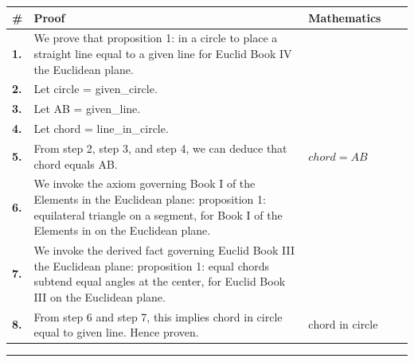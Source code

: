 \documentclass[11pt]{article}
\theoremstyle{definition}
\begin{document}
\begin{tabular}{@{} >{\raggedright\arraybackslash}p{} >{\raggedright\arraybackslash}p{} >{\raggedleft\arraybackslash}p{} @{}}
\textbf{\#} & \textbf{Proof} & \textbf{Mathematics} \\
\midrule
\textbf{1.} & We prove that proposition 1: in a circle to place a straight line equal to a given line for Euclid Book IV the Euclidean plane. & \\[0.45em]
\textbf{2.} & Let circle = given\_circle. & \\[0.45em]
\textbf{3.} & Let AB = given\_line. & \\[0.45em]
\textbf{4.} & Let chord = line\_in\_circle. & \\[0.45em]
\textbf{5.} & From step 2, step 3, and step 4, we can deduce that chord equals AB. & $\displaystyle chord = AB$ \\[0.45em]
\textbf{6.} & We invoke the axiom governing Book I of the Elements in the Euclidean plane: proposition 1: equilateral triangle on a segment, for Book I of the Elements in on the Euclidean plane. & \\[0.45em]
\textbf{7.} & We invoke the derived fact governing Euclid Book III the Euclidean plane: proposition 1: equal chords subtend equal angles at the center, for Euclid Book III on the Euclidean plane. & \\[0.45em]
\textbf{8.} & From step 6 and step 7, this implies chord in circle equal to given line. Hence proven. & $\displaystyle \text{chord in circle equal to given line}$ \\[0.45em]
\bottomrule
\end{tabular}
\label{thm:Geometry-Euclid Book IV-proposition_1_in_a_circle_to_place_a_straight_line_equal_to_a_given_line}
\par\medskip\hrule
\end{document}
